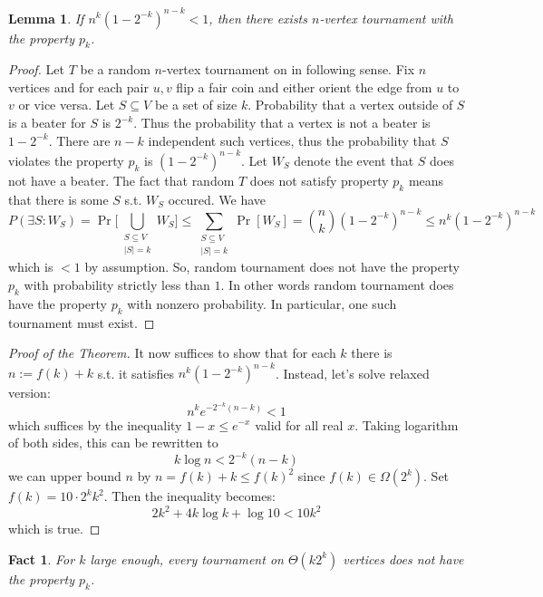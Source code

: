 \documentclass{article}
\theoremstyle{plain}
\newtheorem{lem}[thm]{Lemma}
\newtheorem{fact}[thm]{Fact}
\theoremstyle{definition}
\begin{document}
\begin{lem}
	If $n^k(1-2^{-k})^{n-k} < 1$, then there exists $n$-vertex tournament with the property $p_k$.
\end{lem}
\begin{proof}
	Let $T$ be a random $n$-vertex tournament on in following sense. Fix $n$ vertices and for each pair $u,v$ flip a fair coin and either orient the edge from $u$ to $v$ or vice versa. Let $S\subseteq V$ be a set of size $k$. Probability that a vertex outside of $S$ is a beater for $S$ is $2^{-k}$. Thus the probability that a vertex is not a beater is $1-2^{-k}$. There are $n-k$ independent such vertices, thus the probability that $S$ violates the property $p_k$ is $(1-2^{-k})^{n-k}$. Let $W_S$ denote the event that $S$ does not have a beater. The fact that random $T$ does not satisfy property $p_k$ means that there is some $S$ s.t. $W_S$ occured. We have $$P(\exists S: W_S) = \Pr\bigg[\bigcup_{\substack{S\subseteq V\\|S|=k}}W_S\bigg]\leq \sum_{\substack{S\subseteq V\\|S|=k}} \Pr[W_S] = {n \choose k}(1-2^{-k})^{n-k}\leq n^k(1-2^{-k})^{n-k}$$ which is $<1$ by assumption. So, random tournament does not have the property $p_k$ with probability strictly less than $1$. In other words random tournament does have the property $p_k$ with nonzero probability. In particular, one such tournament must exist.
\end{proof}

\begin{proof}[Proof of the Theorem]
	It now suffices to show that for each $k$ there is $n:=f(k)+k$ s.t. it satisfies $n^k(1-2^{-k})^{n-k}$. Instead, let's solve relaxed version:
	$$
	n^ke^{-2^{-k}(n-k)}<1
	$$
	which suffices by the inequality $1-x\leq e^{-x}$ valid for all real $x$. Taking logarithm of both sides, this can be rewritten to
	$$
	k\log n < 2^{-k}(n-k)
	$$
	we can upper bound $n$ by $n=f(k)+k\leq f(k)^2$ since $f(k)\in \Omega(2^k)$. Set $f(k)=10\cdot 2^kk^2$. Then the inequality becomes:
	$$
	2k^2+4k\log k + \log 10 < 10 k^2
	$$
	which is true.
\end{proof}

\begin{fact}
	For $k$ large enough, every tournament on $\Theta(k2^k)$ vertices does not have the property $p_k$.
\end{fact}
	
\end{document}

